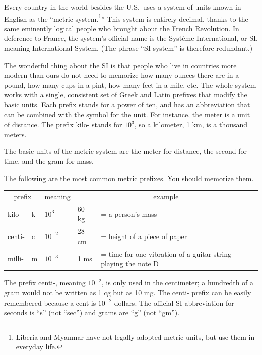 Every country in the world besides the U.S.~uses a
system of units known in English as the ``metric system.\footnote{Liberia and Myanmar have not legally adopted metric units, but use them
in everyday life.}''
This system is entirely decimal, thanks to the same
eminently logical people who brought about the French Revolution. In deference to France, the
system's official name is the Syst\`{e}me International, or SI,
meaning International System. (The phrase ``SI system'' is
therefore redundant.)

The wonderful thing about the SI is that people who live in
countries more modern than ours do not need to memorize how
many ounces there are in a pound, how many cups in a pint,
how many feet in a mile, etc. The whole system works with a
single, consistent set of Greek and Latin prefixes
that modify the basic units. Each
prefix stands for a power of ten, and has an abbreviation
that can be combined with the symbol for the unit. For
instance, the meter is a unit of distance. The prefix kilo-
stands for $10^3$, so a kilometer, 1 km, is a thousand meters.

The basic units of the metric system are the meter for
distance, the second for time, and the gram for mass.

The following are the most common metric prefixes. You
should memorize them.

\begin{tabular}{llllp{60mm}}
    \multicolumn{2}{c}{prefix} & meaning & \multicolumn{2}{c}{example} \\
    kilo-  &   k   & $10^3$     &   60 kg     & =  a person's mass  \\
    centi- &   c   & $10^{-2}$  &   28 cm     & =  height of a piece of paper  \\
    milli- &   m   & $10^{-3}$  &   1 ms     & =  time for one vibration of a guitar string playing the note D
\end{tabular}


The prefix centi-, meaning $10^{-2}$, is only used in the
centimeter; a hundredth of a gram would not be written as 1
cg but as 10 mg. The centi- prefix can be easily remembered
because a cent is $10^{-2}$  dollars. The official SI
abbreviation for seconds is ``s'' (not ``sec'') and grams
are ``g'' (not ``gm'').

